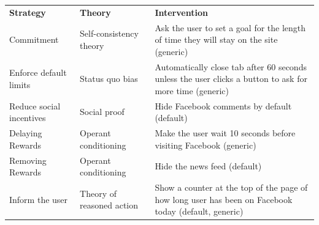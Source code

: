 \begin{table}[tb]
\small
\begin{center}
\begin{tabular}{ p{3.3cm} p{3.4cm} p{6.2cm} }
  \textbf{Strategy} & \textbf{Theory} & \textbf{Intervention} \\
  Commitment & Self-consistency theory~\cite{allgeier1979waffle,cialdini1987influence,sherman1980self} & Ask the user to set a goal for the length of time they will stay on the site (generic) \\
  Enforce default limits & Status quo bias ~\cite{samuelson1988status} & Automatically close tab after 60 seconds unless the user clicks a button to ask for more time (generic) \\
Reduce social incentives & Social proof~\cite{sherif1935study,cialdini1987influence} & Hide Facebook comments by default (default) \\
  Delaying Rewards & Operant conditioning~\cite{baron1991analyzing} & Make the user wait 10 seconds before visiting Facebook (generic) \\
Removing Rewards & Operant conditioning~\cite{baron1991analyzing} & Hide the news feed (default) \\
  Inform the user & Theory of reasoned action~\cite{ajzen1977attitude} & Show a counter at the top of the page of how long user has been on Facebook today (default, generic) \\

\end{tabular}
\end{center}
\end{table}
